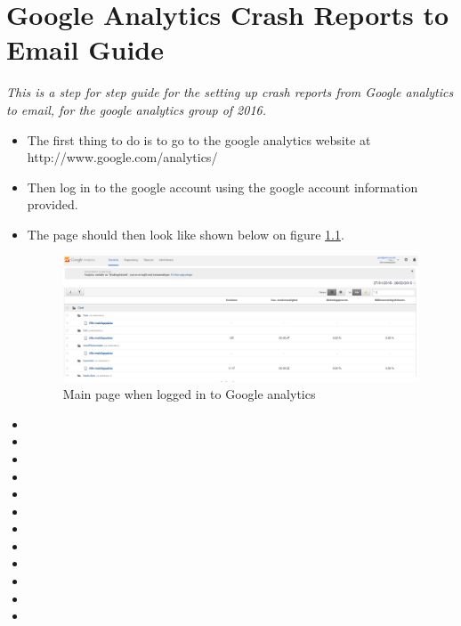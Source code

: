 \chapter{Google Analytics Crash Reports to Email Guide} \label{ChapCrashReport}
\textit{This is a step for step guide for the setting up crash reports from Google analytics to email, for the google analytics group of 2016.}

\begin{itemize}
	\item The first thing to do is to go to the google analytics website at http://www.google.com/analytics/ 
	\item Then log in to the google account using the google account information provided.
	\item The page should then look like shown below on figure \ref{MainPage}.
	\begin{figure}[H]
		\includegraphics[width=0.8 \textwidth]{pictures/MainPage.png}
		\caption{Main page when logged in to Google analytics}
		\label{MainPage}
	\end{figure}
	\item
	\item
	\item
	\item
	\item
	\item
	\item
	\item
	\item
	\item
	\item
	\item
\end{itemize}
	